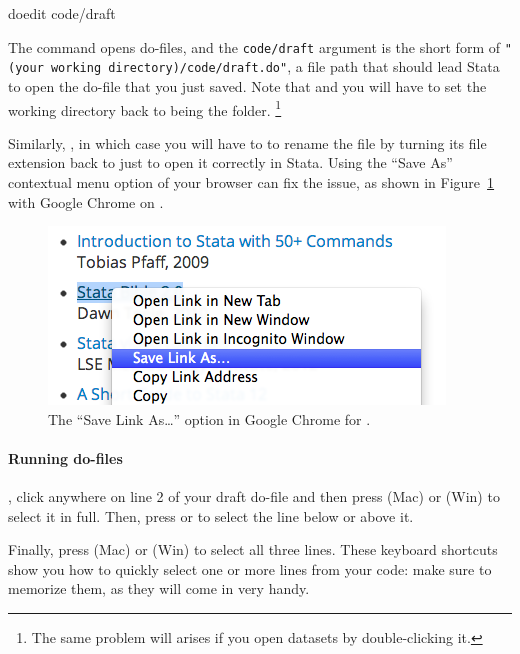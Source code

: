 \begin{docspec}
  doedit code/draft
\end{docspec}

The  command opens do-files, and the \texttt{code/draft} argument is the short form of \texttt{"(your working directory)/code/draft.do"}, a file path that should lead Stata to open the do-file that you just saved. Note that  and you will have to set the working directory back to being the \SRQM folder.%
  \footnote{The same problem will arises if you open datasets by double-clicking it.}

Similarly, , in which case you will have to to rename the file by turning its file extension back to just  to open it correctly in Stata. Using the ``Save As'' contextual menu option of your browser can fix the issue, as shown in Figure~\ref{fig:save-as} with Google Chrome on \OSX.%

\begin{figure}
  \includegraphics[scale=.5]{images/macosx-save-as.png}
  \caption{The ``Save Link As…'' option in Google Chrome for \OSX.}
  \label{fig:save-as}
\end{figure}

\paragraph{Running do-files}

, click anywhere on line 2 of your draft do-file and then press  (Mac) or  (Win) to select it in full. Then, press  or  to select the line below or above it.%

Finally, press  (Mac) or  (Win) to select all three lines. These keyboard shortcuts show you how to quickly select one or more lines from your code: make sure to memorize them, as they will come in very handy.%

